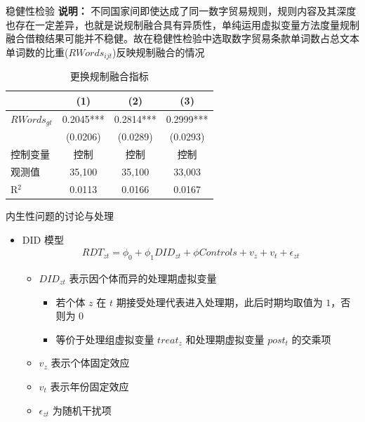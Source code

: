 \documentclass{beamer}
\begin{document}
\begin{frame}{稳健性检验}
    \footnotesize \textbf{说明：} 不同国家间即使达成了同一数字贸易规则，规则内容及其深度也存在一定差异，也就是说规制融合具有异质性，单纯运用虚拟变量方法度量规制融合借粮结果可能并不稳健。故在稳健性检验中选取数字贸易条款单词数占总文本单词数的比重($RWords_{ijt}$)反映规制融合的情况
    \begin{table}
        \centering
        \caption{更换规制融合指标}
        \label{tab:robustness_check}
        \begin{tabular}{lccc}
            \toprule
            & (1) & (2) & (3) \\
            \midrule
            $RWords_{gt}$ & 0.2045*** & 0.2814*** & 0.2999*** \\
             & (0.0206) & (0.0289) & (0.0293) \\
            控制变量 & 控制 & 控制 & 控制 \\
            观测值 & 35,100 & 35,100 & 33,003 \\
            R$^2$ & 0.0113 & 0.0166 & 0.0167 \\
            \bottomrule
        \end{tabular}
    \end{table}
\end{frame}

\begin{frame}{内生性问题的讨论与处理}
    \begin{itemize}
        \item DID 模型
        \begin{gather*}
            RDT_{zt}=\phi_0+\phi_1 DID_{zt}+\phi Controls+v_z+v_t+\epsilon_{zt} \tag{13}
        \end{gather*}
        \begin{itemize}
            \item $DID_{zt}$ 表示因个体而异的处理期虚拟变量
            \begin{itemize}
                \item 若个体 $z$ 在 $t$ 期接受处理代表进入处理期，此后时期均取值为 $1$，否则为 $0$
                \item 等价于处理组虚拟变量 $treat_z$ 和处理期虚拟变量 $post_t$ 的交乘项
            \end{itemize}
            \item $v_z$ 表示个体固定效应
            \item $v_t$ 表示年份固定效应
            \item $\epsilon_{zt}$ 为随机干扰项
        \end{itemize}
    \end{itemize}    
\end{frame}
\end{document}
